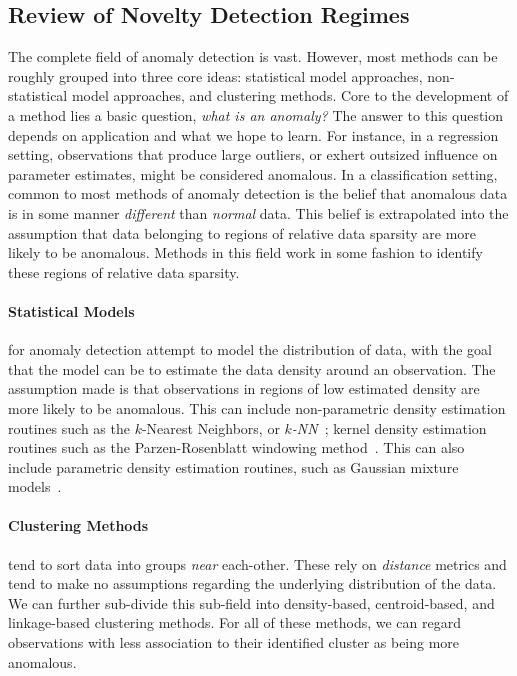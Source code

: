 \subsection{Review of Novelty Detection Regimes}

The complete field of anomaly detection is vast.  However, most methods can be 
    roughly grouped into three core ideas: statistical model approaches, 
    non-statistical model approaches, and clustering methods. Core to the 
    development of a method lies a basic question, \emph{what is an anomaly?}  
    The answer to this question depends on application and what we hope to
    learn.  For instance, in a regression setting, observations that produce 
    large outliers, or exhert outsized influence on parameter estimates, might 
    be considered anomalous.  In a classification setting, common to most 
    methods of anomaly detection is the belief that anomalous data is in some 
    manner \emph{different} than \emph{normal} data. This belief is extrapolated
    into the assumption that data belonging to regions of relative data sparsity
    are more likely to be anomalous.  Methods in this field work in some fashion
     to identify these regions of relative data sparsity.

\paragraph{Statistical Models} for anomaly detection attempt to model the 
    distribution of data, with the goal that the model can be to estimate the 
    data density around an observation. The assumption made is that observations
    in regions of low estimated density are more likely to be anomalous.  This 
    can include non-parametric density estimation routines such as the 
    $k$-Nearest Neighbors, or \emph{$k$-NN}~\citep{kramer2013}; kernel density 
    estimation routines such as the Parzen-Rosenblatt windowing 
    method~\citep{parzen1962,rosenblatt1956}.  This can also include parametric 
    density estimation routines, such as Gaussian mixture 
    models~\citep{mcnicholas2010}.

\paragraph{Clustering Methods} tend to sort data into groups \emph{near} 
    each-other.  These rely on \emph{distance} metrics and tend to make no 
    assumptions regarding the underlying distribution of the data.  We can 
    further sub-divide this sub-field into density-based, centroid-based, and 
    linkage-based clustering methods.  For all of these methods, we can regard 
    observations with less association to their identified cluster as being more
    anomalous.


